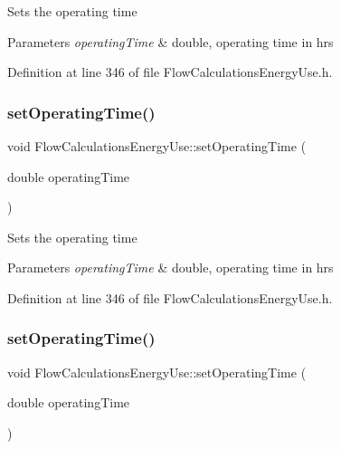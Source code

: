 Sets the operating time


\begin{DoxyParams}{Parameters}
{\em operating\+Time} & double, operating time in hrs \\
\hline
\end{DoxyParams}


Definition at line 346 of file Flow\+Calculations\+Energy\+Use.\+h.

\mbox{\label{class_flow_calculations_energy_use_ac82800d533502c7836238dcab1f39fac}} 
\subsubsection{\texorpdfstring{set\+Operating\+Time()}{setOperatingTime()}\hspace{0.1cm}{\footnotesize\ttfamily [2/3]}}
{\footnotesize\ttfamily void Flow\+Calculations\+Energy\+Use\+::set\+Operating\+Time (\begin{DoxyParamCaption}\item[{double}]{operating\+Time }\end{DoxyParamCaption})\hspace{0.3cm}{\ttfamily [inline]}}

Sets the operating time


\begin{DoxyParams}{Parameters}
{\em operating\+Time} & double, operating time in hrs \\
\hline
\end{DoxyParams}


Definition at line 346 of file Flow\+Calculations\+Energy\+Use.\+h.

\mbox{\label{class_flow_calculations_energy_use_ac82800d533502c7836238dcab1f39fac}} 
\subsubsection{\texorpdfstring{set\+Operating\+Time()}{setOperatingTime()}\hspace{0.1cm}{\footnotesize\ttfamily [3/3]}}
{\footnotesize\ttfamily void Flow\+Calculations\+Energy\+Use\+::set\+Operating\+Time (\begin{DoxyParamCaption}\item[{double}]{operating\+Time }\end{DoxyParamCaption})\hspace{0.3cm}{\ttfamily [inline]}}

